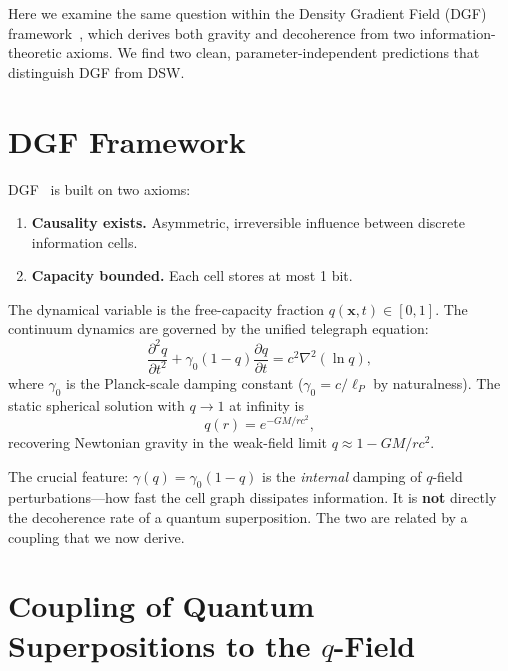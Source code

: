 \documentclass[aps,prl,twocolumn,showpacs,superscriptaddress,preprintnumbers]{revtex4-2}
\begin{document}
Here we examine the same question within the Density Gradient Field (DGF) framework~\cite{Huang:2026prd}, which derives both gravity and decoherence from two information-theoretic axioms.
We find two clean, parameter-independent predictions that distinguish DGF from DSW.

\section{DGF Framework}

DGF~\cite{Huang:2026prd} is built on two axioms:
\begin{enumerate}
    \item[A1.] \textbf{Causality exists.} Asymmetric, irreversible influence between discrete information cells.
    \item[A2.] \textbf{Capacity bounded.} Each cell stores at most 1 bit.
\end{enumerate}

The dynamical variable is the free-capacity fraction $q(\mathbf{x},t)\in[0,1]$.
The continuum dynamics are governed by the unified telegraph equation:
\begin{equation}
\frac{\partial^2 q}{\partial t^2} + \gamma_0(1-q)\frac{\partial q}{\partial t}
= c^2\nabla^2(\ln q),
\label{eq:telegraph}
\end{equation}
where $\gamma_0$ is the Planck-scale damping constant ($\gamma_0=c/\ell_P$ by naturalness).
The static spherical solution with $q\to1$ at infinity is
\begin{equation}
q(r) = e^{-GM/rc^2},
\label{eq:qstatic}
\end{equation}
recovering Newtonian gravity in the weak-field limit $q\approx1-GM/rc^2$.

The crucial feature: $\gamma(q)=\gamma_0(1-q)$ is the \emph{internal} damping of $q$-field perturbations---how fast the cell graph dissipates information.
It is \textbf{not} directly the decoherence rate of a quantum superposition.
The two are related by a coupling that we now derive.

\section{Coupling of Quantum Superpositions to the $q$-Field}
\end{document}
